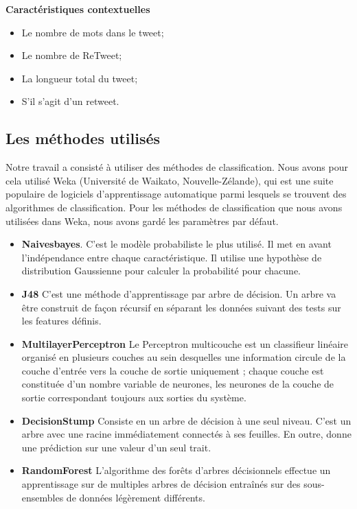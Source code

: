 \documentclass[10pt,a4paper,twoside]{article}
\begin{document}
\textbf{Caractéristiques contextuelles}
\begin{itemize}
\item Le nombre de mots dans le tweet;
\item Le nombre de ReTweet;
\item La longueur total du tweet;
\item S'il s'agit d'un retweet.
\end{itemize}
\vspace{0.5cm}

\subsection{Les méthodes utilisés}
\label{methode}
Notre travail a consisté à utiliser des méthodes de classification. Nous avons pour cela utilisé Weka (Université de Waikato, Nouvelle-Zélande), qui est une suite populaire de logiciels d'apprentissage automatique parmi lesquels se trouvent des algorithmes de classification.
Pour les méthodes de classification que nous avons utilisées dans Weka, nous avons gardé les paramètres par défaut. \\
\begin{itemize}
\item\textbf{Naivesbayes}. C'est le modèle probabiliste le plus utilisé. Il met en avant l'indépendance entre chaque caractéristique. Il utilise une hypothèse de distribution Gaussienne pour calculer la probabilité pour chacune.\\
\item\textbf{J48} C'est une méthode d'apprentissage par arbre de décision. Un arbre va être construit de façon récursif en séparant les données suivant des tests sur les features définis.  \\
\item\textbf{MultilayerPerceptron} Le Perceptron multicouche est un classifieur linéaire organisé en plusieurs couches au sein desquelles une information circule de la couche d'entrée vers la couche de sortie uniquement ; chaque couche est constituée d'un nombre variable de neurones, les neurones de la couche de sortie correspondant toujours aux sorties du système.\\
\item\textbf{DecisionStump} Consiste en un arbre de décision à une seul niveau. C'est un arbre avec une racine immédiatement connectés à ses feuilles. En outre, donne une prédiction sur une valeur d'un seul trait.\\
\item\textbf{RandomForest} L'algorithme des forêts d'arbres décisionnels effectue un apprentissage sur de multiples arbres de décision entraînés sur des sous-ensembles de données légèrement différents.
\end{itemize}
\end{document}

